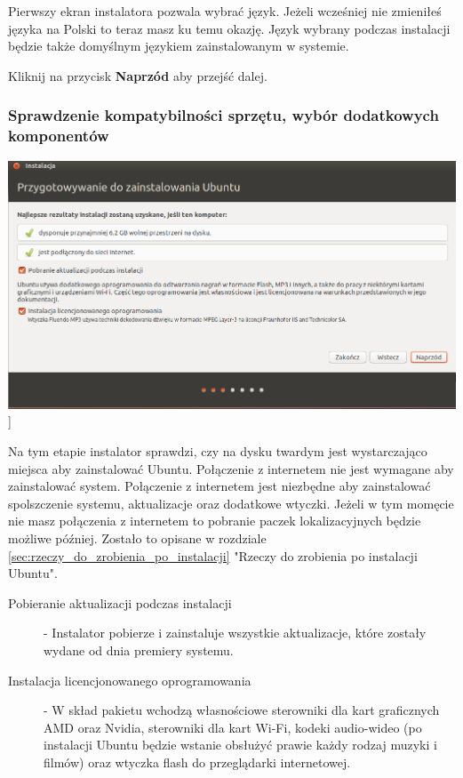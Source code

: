 Pierwszy ekran instalatora pozwala wybrać język. Jeżeli wcześniej nie zmieniłeś języka na Polski to teraz masz ku temu okazję. Język wybrany podczas instalacji będzie także domyślnym językiem zainstalowanym w systemie.

\begin{flushright}
Kliknij na przycisk \textbf{Naprzód} aby przejść dalej.
\end{flushright}
\clearpage

\subsubsection{Sprawdzenie kompatybilności sprzętu, wybór dodatkowych komponentów}
\begin{center}
	\includegraphics[scale=0.5]{images/instalator_wymagania.png}]
\end{center}

Na tym etapie instalator sprawdzi, czy na dysku twardym jest wystarczająco miejsca aby zainstalować Ubuntu. Połączenie z internetem nie jest wymagane aby zainstalować system. Połączenie z internetem jest niezbędne aby zainstalować spolszczenie systemu, aktualizacje oraz dodatkowe wtyczki. Jeżeli w tym momęcie nie masz połączenia z internetem to pobranie paczek lokalizacyjnych będzie możliwe później. Zostało to opisane w rozdziale \ref{sec:rzeczy_do_zrobienia_po_instalacji} "Rzeczy do zrobienia po instalacji Ubuntu".

\begin{description}
\item[Pobieranie aktualizacji podczas instalacji] - Instalator pobierze i zainstaluje wszystkie aktualizacje, które zostały wydane od dnia premiery systemu.
\item[Instalacja licencjonowanego oprogramowania] - W skład pakietu wchodzą własnościowe sterowniki dla kart graficznych AMD oraz Nvidia, sterowniki dla kart Wi-Fi, kodeki audio-wideo (po instalacji Ubuntu będzie wstanie obsłużyć prawie każdy rodzaj muzyki i filmów) oraz wtyczka flash do przeglądarki internetowej.
\end{description}

